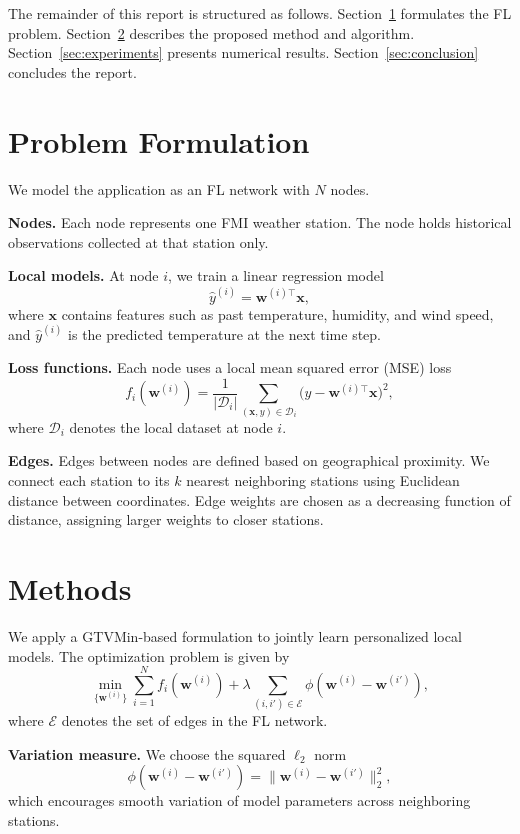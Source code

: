 \documentclass[9pt]{article}
\begin{document}
	The remainder of this report is structured as follows.
	Section~\ref{sec:pf} formulates the FL problem.
	Section~\ref{sec:methods} describes the proposed method and algorithm.
	Section~\ref{sec:experiments} presents numerical results.
	Section~\ref{sec:conclusion} concludes the report.
	
	\section{Problem Formulation}
	\label{sec:pf}
	
	We model the application as an FL network with $N$ nodes.
	
	{\bf Nodes.}
	Each node represents one FMI weather station. 
	The node holds historical observations collected at that station only.
	
	{\bf Local models.}
	At node $i$, we train a linear regression model
	\[
	\hat{y}^{(i)} = \mathbf{w}^{(i)\top} \mathbf{x},
	\]
	where $\mathbf{x}$ contains features such as past temperature, humidity, and wind speed,
	and $\hat{y}^{(i)}$ is the predicted temperature at the next time step.
	
   {\bf Loss functions.}
	Each node uses a local mean squared error (MSE) loss
	\[
	f_i(\mathbf{w}^{(i)}) =
	\frac{1}{|\mathcal{D}_i|}
	\sum_{(\mathbf{x},y)\in \mathcal{D}_i}
	\bigl(y - \mathbf{w}^{(i)\top}\mathbf{x}\bigr)^2,
	\]
	where $\mathcal{D}_i$ denotes the local dataset at node $i$.
	
	{\bf Edges.}
	Edges between nodes are defined based on geographical proximity.
	We connect each station to its $k$ nearest neighboring stations using Euclidean distance
	between coordinates.
	Edge weights are chosen as a decreasing function of distance, assigning larger weights
	to closer stations.
	
	\section{Methods}
	\label{sec:methods}
	
	We apply a GTVMin-based formulation to jointly learn personalized local models.
	The optimization problem is given by
	\[
	\min_{\{\mathbf{w}^{(i)}\}}
	\sum_{i=1}^N f_i(\mathbf{w}^{(i)})
	+ \lambda \sum_{(i,i')\in \mathcal{E}}
	\phi\!\left(\mathbf{w}^{(i)} - \mathbf{w}^{(i')}\right),
	\]
	where $\mathcal{E}$ denotes the set of edges in the FL network.
	
	{\bf Variation measure.}
	We choose the squared $\ell_2$ norm
	\[
	\phi(\mathbf{w}^{(i)} - \mathbf{w}^{(i')})
	= \|\mathbf{w}^{(i)} - \mathbf{w}^{(i')}\|_2^2,
	\]
	which encourages smooth variation of model parameters across neighboring stations.
	
\end{document}
